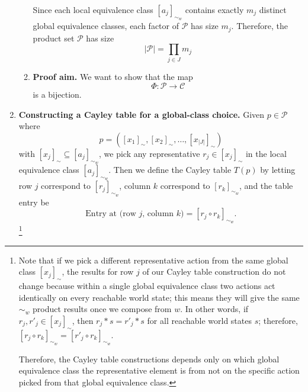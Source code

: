 \begin{proofE}
\begin{enumerate}[(1)]
\begin{enumerate}
        Since each local equivalence class $[a_{j}]_{\sim_{w}}$ contains exactly $m_{j}$ distinct global equivalence classes, each factor of $\mathcal{P}$ has size $m_{j}$.
        Therefore, the product set $\mathcal{P}$ has size
        \begin{equation}\label{eqn:product_set_size}
            |\mathcal{P}| = \prod_{j \in J} m_{j}
        \end{equation}

        \item \textbf{Proof aim.}
        We want to show that the map
        \begin{equation}
            \Phi: \mathcal{P} \to \mathcal{C}
        \end{equation}
        is a bijection.
    \end{enumerate}

    \item \textbf{Constructing a Cayley table for a global-class choice.}
    Given $p \in \mathcal{P}$ where
    \begin{equation}
        p = ([x_{1}]_{\sim}, [x_{2}]_{\sim}, \dots , [x_{|J|}]_{\sim})
    \end{equation}
    with $[x_{j}]_{\sim} \subseteq [a_{j}]_{\sim_{w}}$, we pick any representative $r_{j} \in [x_{j}]_{\sim}$ in the local equivalence class $[a_{j}]_{\sim_{w}}$.
    Then we define the Cayley table $T(p)$ by letting row $j$ correspond to $[r_{j}]_{\sim_{w}}$, column $k$ correspond to $[r_{k}]_{\sim_{w}}$, and the table entry be
    \begin{equation}
        \text{Entry at (row $j$, column $k$)} = [r_{j} \circ r_{k}]_{\sim_{w}}.
    \end{equation}
    \footnote{
    Note that if we pick a different representative action from the same global class $[x_{j}]_{\sim}$, the results for row $j$ of our Cayley table construction do not change because within a single global equivalence class two actions act identically on every reachable world state; this means they will give the same $\sim_{w}$ product results once we compose from $w$.
    In other words, if $r_{j}, r'_{j} \in [x_{j}]_{\sim}$, then $r_{j} \ast s = r'_{j} \ast s$ for all reachable world states $s$; therefore, $[r_{j} \circ r_{k}]_{\sim_{w}} = [r'_{j} \circ r_{k}]_{\sim_{w}}$.
    
    Therefore, the Cayley table constructions depends only on which global equivalence class the representative element is from not on the specific action picked from that global equivalence class.
    }


\end{enumerate}
\end{proofE}
